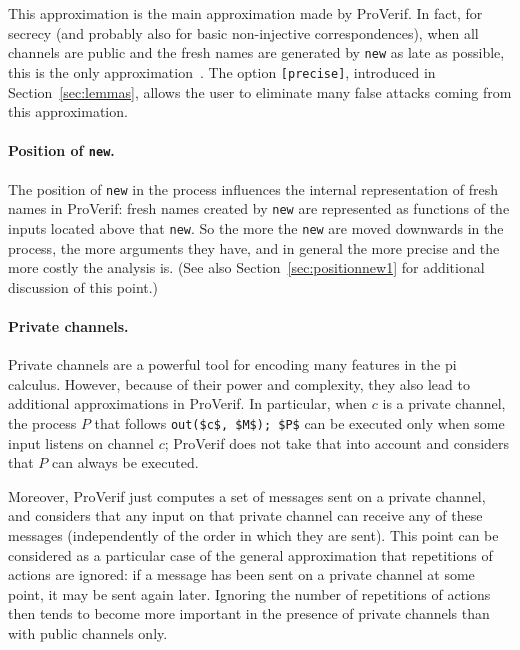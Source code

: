 \documentclass{book}
\begin{document}
This approximation is the main approximation made by ProVerif.  In
fact, for secrecy (and probably also for basic non-injective
correspondences), when all channels are public and the fresh names are
generated by \lstinline!new! as late as possible, this is the only
approximation~\cite{Blanchet05b}. The option \lstinline![precise]!,
introduced in Section~\ref{sec:lemmas}, allows the user to
eliminate many false attacks coming from this approximation.

\paragraph{Position of \lstinline!new!.}

The position of \lstinline!new! in the process influences the internal
representation of fresh names in ProVerif: fresh names created by
\lstinline!new! are represented as functions of the inputs located
above that \lstinline!new!. So the more the \lstinline!new! are
moved downwards in the process, the more arguments they have,
and in general the more precise and the more costly the analysis is.
(See also Section~\ref{sec:positionnew1} for additional discussion of
this point.)

\paragraph{Private channels.}

Private channels are a powerful tool for encoding many features in the
pi calculus. However, because of their power and complexity, they also
lead to additional approximations in ProVerif. In particular, when $c$
is a private channel, the process $P$ that follows
\lstinline!out($c$, $M$); $P$! can be executed only when some input
listens on channel $c$; ProVerif does not take that into account and
considers that $P$ can always be executed.

Moreover, ProVerif just computes a set of messages sent on a private
channel, and considers that any input on that private channel
can receive any of these
messages (independently of the order in which they are sent).  This
point can be considered as a particular case of the general
approximation that repetitions of actions are ignored: if a message
has been sent on a private channel at some point, it may be sent
again later. Ignoring the number of repetitions of actions then tends
to become more important in the presence of private channels
than with public channels only.
\end{document}
